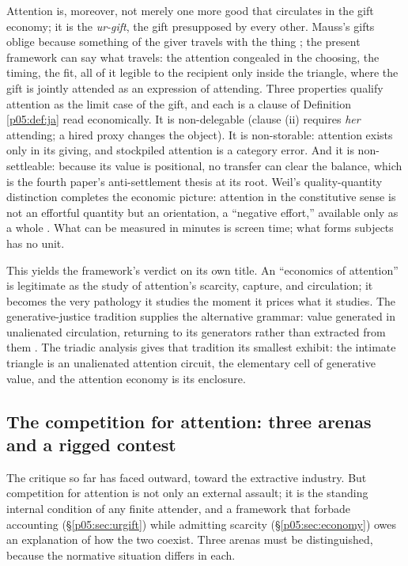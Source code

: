 Attention is, moreover, not merely one more good that circulates in the gift economy; it is the \emph{ur-gift}, the gift presupposed by every other. Mauss's gifts oblige because something of the giver travels with the thing \parencite{mauss1990}; the present framework can say what travels: the attention congealed in the choosing, the timing, the fit, all of it legible to the recipient only inside the triangle, where the gift is jointly attended as an expression of attending. Three properties qualify attention as the limit case of the gift, and each is a clause of Definition \ref{p05:def:ja} read economically. It is non-delegable (clause (ii) requires \emph{her} attending; a hired proxy changes the object). It is non-storable: attention exists only in its giving, and stockpiled attention is a category error. And it is non-settleable: because its value is positional, no transfer can clear the balance, which is the fourth paper's anti-settlement thesis at its root. Weil's quality-quantity distinction completes the economic picture: attention in the constitutive sense is not an effortful quantity but an orientation, a ``negative effort,'' available only as a whole \parencite{weil1951, weil2002}. What can be measured in minutes is screen time; what forms subjects has no unit.

This yields the framework's verdict on its own title. An ``economics of attention'' is legitimate as the study of attention's scarcity, capture, and circulation; it becomes the very pathology it studies the moment it prices what it studies. The generative-justice tradition supplies the alternative grammar: value generated in unalienated circulation, returning to its generators rather than extracted from them \parencite{eglash2016}. The triadic analysis gives that tradition its smallest exhibit: the intimate triangle is an unalienated attention circuit, the elementary cell of generative value, and the attention economy is its enclosure.

\subsection{The competition for attention: three arenas and a rigged contest}
\label{p05:sec:competition}

The critique so far has faced outward, toward the extractive industry. But competition for attention is not only an external assault; it is the standing internal condition of any finite attender, and a framework that forbade accounting (§\ref{p05:sec:urgift}) while admitting scarcity (§\ref{p05:sec:economy}) owes an explanation of how the two coexist. Three arenas must be distinguished, because the normative situation differs in each.

